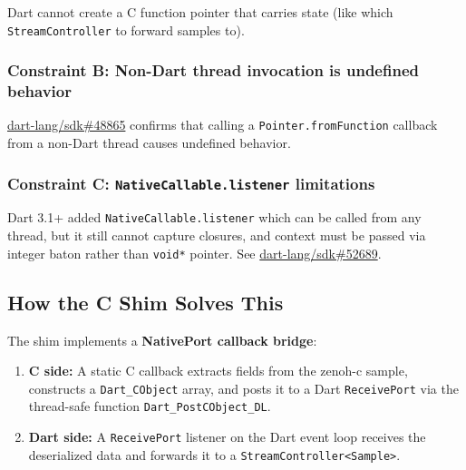 \documentclass[11pt,a4paper]{article}
\newcommand{\code}[1]{\texttt{#1}}
\newcommand{\fn}[1]{\texttt{#1}}
\begin{document}
Dart cannot create a C function pointer that carries state (like which
\code{StreamController} to forward samples to).

\subsubsection{Constraint B: Non-Dart thread invocation is undefined behavior}

\href{https://github.com/dart-lang/sdk/issues/48865}{dart-lang/sdk\#48865}
confirms that calling a \fn{Pointer.fromFunction} callback from a non-Dart
thread causes undefined behavior.

\subsubsection{Constraint C: \code{NativeCallable.listener} limitations}

Dart 3.1+ added \code{NativeCallable.listener} which can be called from any
thread, but it still cannot capture closures, and context must be passed via
integer baton rather than \code{void*} pointer.
See \href{https://github.com/dart-lang/sdk/issues/52689}{dart-lang/sdk\#52689}.


\subsection{How the C Shim Solves This}

The shim implements a \textbf{NativePort callback bridge}:

\begin{enumerate}
  \item \textbf{C side:} A static C callback extracts fields from the
        zenoh-c sample, constructs a \code{Dart\_CObject} array, and posts
        it to a Dart \code{ReceivePort} via the thread-safe function
        \fn{Dart\_\allowbreak{}Post\-CObject\_DL}.
  \item \textbf{Dart side:} A \code{ReceivePort} listener on the Dart event
        loop receives the deserialized data and forwards it to a
        \code{StreamController<Sample>}.
\end{enumerate}
\end{document}
